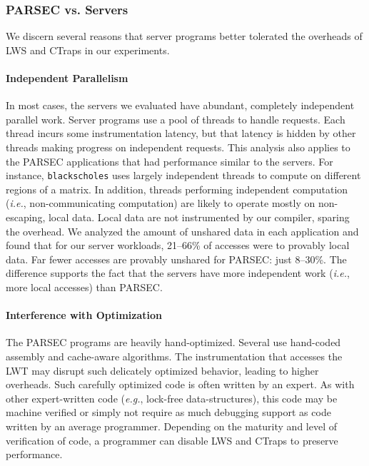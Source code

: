 \documentclass[10pt,nocopyrightspace]{sigplanconf}
\newcommand{\ctraps}{CTraps\xspace}
\newcommand{\lws}{LWS\xspace}
\newcommand{\lwt}{LWT\xspace}
\begin{document}
\subsubsection{PARSEC vs. Servers}
\label{sec:eval:parsecserver}
We discern several reasons that server programs better tolerated the overheads of
\lws and \ctraps in our experiments.

\paragraph{Independent Parallelism}
In most cases, the servers we evaluated have abundant, completely independent
parallel work.  Server programs use a pool of threads to handle requests.  Each
thread incurs some instrumentation latency, but that latency is hidden by other
threads making progress on independent requests.  This analysis also applies to
the PARSEC applications that had performance similar to the servers.  For
instance, {\tt blackscholes} uses largely independent threads to compute on
different regions of a matrix.  In addition, threads performing independent
computation ({\em i.e.}, non-communicating computation) are likely to operate
mostly on non-escaping, local data.  Local data are not instrumented by our
compiler, sparing the overhead.  We analyzed the amount of unshared data in
each application and found that for our server workloads, 21--66\% of accesses
were to provably local data.  Far fewer accesses are provably unshared for
PARSEC: just 8--30\%. The difference supports the fact that the servers have
more independent work ({\em i.e.}, more local accesses) than PARSEC. 



\paragraph{Interference with Optimization}
The PARSEC programs are heavily hand-optimized. Several use hand-coded assembly
and cache-aware algorithms.  The instrumentation that accesses the \lwt may
disrupt such delicately optimized behavior, leading to higher overheads.  Such
carefully optimized code is often written by an expert.  As with other
expert-written code ({\em e.g.}, lock-free data-structures), this code may be
machine verified or simply not require as much debugging support as code written by an
average programmer.  Depending on the maturity and level of verification of
code, a programmer can disable \lws and \ctraps to preserve performance. 
 
\end{document}
